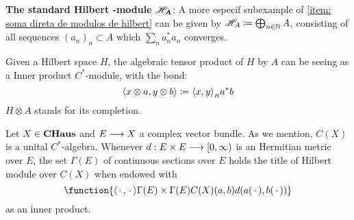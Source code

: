 \begin{exemplos}
\begin{itroman}
    \item \textbf{The standard Hilbert -module $\boldsymbol{\mathscr H_A}$}: A more especif subexample of \ref{item: soma direta de modulos de hilbert} can be given by $\mathscr H_A \coloneqq \bigoplus_{n\in \mathbb N} A$, consisting of all sequences $(a_n)_n \subset A$ which $\sum_n a_n^*a_n$ converges.
    \item \label{exemplo hilb (X) C*algebra} Given a Hilbert space $H$, the algebraic tensor product of $H$ by $A$ can be seeing as a Inner product $C^*$-module, with the bond:
    \[
    \inner {x\otimes a}{y\otimes b} \coloneqq \sub{\inner xy}H a^*b
    \]
    $H\otimes A$ stands for its completion.
    
    \item Let $X \in \boldsymbol{\operatorname{CHaus}}$ and $E\longrightarrow X$ a complex vector bundle. As we mention, $C(X)$ is a unital $C^*$-algebra. Whenever $d: E\times E \longrightarrow [0,\infty)$ is an Hermitian metric over $E$, the set $\Gamma (E)$ of continuous sections over $E$ holds the title of Hilbert module over $C(X)$ when endowed with
    \begin{equation*}
    \function{{\inner\come\come}{\Gamma(E)\times \Gamma(E)}{C(X)}{(a,b)}{d(a(\,\cdot\,),b(\,\cdot\,))}} 
    \end{equation*}
    as an inner product.

\end{itroman}
\end{exemplos}
%

